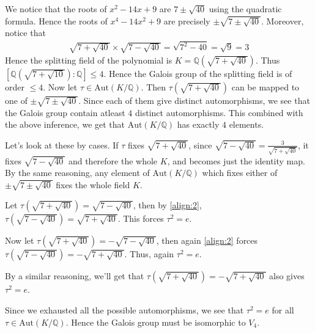 \documentclass[12pt]{exam}
\theoremstyle{plain} %
\theoremstyle{definition} %
\theoremstyle{remark} %
\begin{document}
\begin{questions}
    \question
    \begin{solution}
      We notice that the roots of $x^2
      - 14x + 9$ are $7 \pm \sqrt{40}$
      using the quadratic formula. Hence the roots of $x^4 - 14x^2 + 9$
      are precisely $\pm \sqrt{7 \pm \sqrt{40}}$. Moreover, notice that
      \begin{align}
        \label{align:2}
        \sqrt{7 + \sqrt{40}} \times \sqrt{7 - \sqrt{40}} = \sqrt{7^2 -
        40} = \sqrt{9} = 3
      \end{align}
      Hence the splitting field of the polynomial is
      $K = \mathbb{Q}(\sqrt{7 + \sqrt{40}})$. Thus
      $[\mathbb{Q}(\sqrt{7 + \sqrt{10}}): \mathbb{Q}] \le 4$. Hence
      the Galois group of the splitting field is of order $\le 4$.
      Now let $\tau \in \textrm{Aut}(K/\mathbb{Q})$. Then $\tau(\sqrt{7
      + \sqrt{40}})$ can be mapped to one of $\pm \sqrt{7 \pm
      \sqrt{40}}$. Since each of them give
      distinct automorphisms, we see that the Galois group contain
      atleast $4$ distinct automorphisms. This combined with the
      above inference, we get that $\textrm{Aut}(K/\mathbb{Q})$ has
      exactly $4$ elements.

      Let's look at these by cases. If $\tau$ fixes
      $\sqrt{7 + \sqrt{40}}$, since $\sqrt{7 - \sqrt{40}} =
      \frac{3}{\sqrt{7 + \sqrt{40}}}$, it fixes $\sqrt{7 - \sqrt{40}}$
      and therefore the whole $K$, and becomes just the identity map.
      By the same reasoning, any element of
      $\textrm{Aut}(K/\mathbb{Q})$ which fixes either of $\pm \sqrt{7
      \pm \sqrt{40}}$ fixes the whole field $K$.

      Let $\tau(\sqrt{7 + \sqrt{40}}) =\sqrt{7 - \sqrt{40}}$, then by
      \autoref{align:2}, $\tau(\sqrt{7 - \sqrt{40}}) =\sqrt{7 +
      \sqrt{40}}$. This forces $\tau^2 = e$.

      Now let $\tau(\sqrt{7 + \sqrt{40}}) = -\sqrt{7 - \sqrt{40}}$,
      then again \autoref{align:2} forces $\tau(\sqrt{7 - \sqrt{40}}) =
      -\sqrt{7 + \sqrt{40}}$. Thus, again $\tau^2 = e$.

      By a similar reasoning, we'll get that $\tau(\sqrt{7 +
      \sqrt{40}}) = -\sqrt{7 + \sqrt{40}}$ also gives $\tau^2 = e$.

      Since we exhausted all the possible automorphisms, we see that
      $\tau^2 = e$ for all $\tau \in \textrm{Aut}(K/\mathbb{Q})$. Hence
      the Galois group must be isomorphic to $V_4$.
    \end{solution}


\end{questions}
\end{document}
